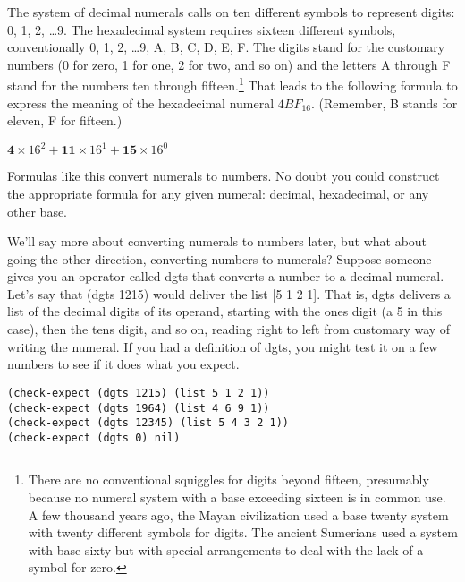 The system of decimal numerals calls on ten different symbols to represent digits:
0, 1, 2, \dots 9.
The hexadecimal system requires sixteen different symbols, conventionally
0, 1, 2, \dots 9, A, B, C, D, E, F.
The digits stand for the customary numbers
(0 for zero, 1 for one, 2 for two, and so on)
and the letters A through F
stand for the numbers ten through fifteen.\footnote{There
are no conventional squiggles for digits beyond fifteen,
presumably because no numeral system
with a base exceeding sixteen is in common use.
A few thousand years ago, the Mayan civilization used a base twenty system
with twenty different symbols for digits.
The ancient Sumerians used a system with base sixty
but with special arrangements to deal with the lack of a symbol for zero.}
That leads to the following
formula to express the meaning of the hexadecimal numeral $4BF_{16}$.
(Remember, B stands for eleven, F for fifteen.)
\begin{center}
$\textbf{4} \times 16^2 + \textbf{11} \times 16^1 + \textbf{15} \times 16^0$
\end{center}
Formulas like this
convert numerals to numbers.
No doubt you could construct the appropriate formula
for any given numeral: decimal, hexadecimal, or any other base.

We'll say more about converting numerals to numbers later,
but what about going the other direction, converting
numbers to numerals?
Suppose someone gives you an operator called \textsf{dgts} that
converts a number to a decimal numeral.
Let's say that \textsf{(dgts 1215)} would deliver the list \textsf{[5 1 2 1]}.
That is, \textsf{dgts} delivers a list of the decimal digits
of its operand,
starting with the ones digit (a 5 in this case),
then the tens digit, and so on, reading right to left from
customary way of writing the numeral.
If you had a definition of \textsf{dgts},
you might test it on a few numbers to see if it does what you expect.
\begin{code}
\begin{verbatim}
(check-expect (dgts 1215) (list 5 1 2 1))
(check-expect (dgts 1964) (list 4 6 9 1))
(check-expect (dgts 12345) (list 5 4 3 2 1))
(check-expect (dgts 0) nil)
\end{verbatim}
\end{code}

